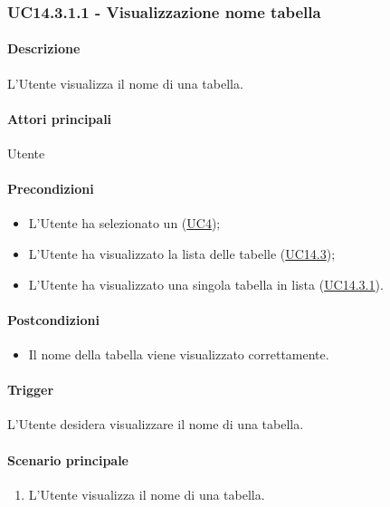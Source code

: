 \subsubsection{UC14.3.1.1 - Visualizzazione nome tabella}\label{UC14point3point1point1}
\paragraph*{Descrizione}
L'Utente visualizza il nome di una tabella.

\paragraph*{Attori principali}
Utente

\paragraph*{Precondizioni}
\begin{itemize}
  \item L'Utente ha selezionato un  (\hyperref[UC4]{UC4});
  \item L'Utente ha visualizzato la lista delle tabelle (\hyperref[UC14point3]{UC14.3});
  \item L'Utente ha visualizzato una singola tabella in lista (\hyperref[UC14point3point1]{UC14.3.1}).
\end{itemize}

\paragraph*{Postcondizioni}
\begin{itemize}
  \item Il nome della tabella viene visualizzato correttamente.
\end{itemize}

\paragraph*{Trigger}
L'Utente desidera visualizzare il nome di una tabella.

\paragraph*{Scenario principale}
\begin{enumerate}
  \item L'Utente visualizza il nome di una tabella.
\end{enumerate}

